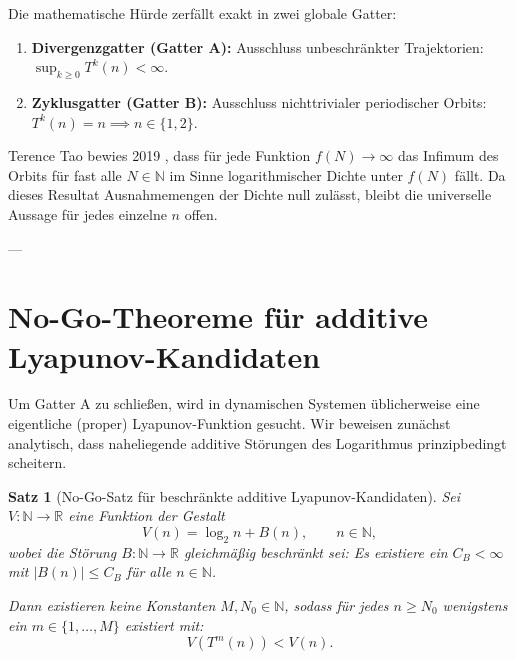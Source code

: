 \documentclass[11pt,reqno]{amsart}
\newtheorem{theorem}{Satz}[section]
\theoremstyle{definition}
\theoremstyle{remark}
\numberwithin{equation}{section}
\begin{document}
Die mathematische H\"urde zerf\"allt exakt in zwei globale Gatter:
\begin{enumerate}
\item \textbf{Divergenzgatter (Gatter A):} Ausschluss unbeschr\"ankter Trajektorien: $\sup_{k \ge 0} T^k(n) < \infty$.
\item \textbf{Zyklusgatter (Gatter B):} Ausschluss nichttrivialer periodischer Orbits: $T^k(n) = n \implies n \in \{1, 2\}$.
\end{enumerate}

Terence Tao bewies 2019 \cite{Tao2019}, dass f\"ur jede Funktion $f(N) \to \infty$ das Infimum des Orbits f\"ur fast alle $N \in \mathbb{N}$ im Sinne logarithmischer Dichte unter $f(N)$ f\"allt. Da dieses Resultat Ausnahmemengen der Dichte null zul\"asst, bleibt die universelle Aussage f\"ur jedes einzelne $n$ offen.

---

\section{No-Go-Theoreme f\"ur additive Lyapunov-Kandidaten}

Um Gatter A zu schlie\ss{}en, wird in dynamischen Systemen \"ublicherweise eine eigentliche (proper) Lyapunov-Funktion gesucht. Wir beweisen zun\"achst analytisch, dass naheliegende additive St\"orungen des Logarithmus prinzipbedingt scheitern.

\begin{theorem}[No-Go-Satz f\"ur beschr\"ankte additive Lyapunov-Kandidaten]
\label{thm:nogo_lyapunov}
Sei $V: \mathbb{N} \to \mathbb{R}$ eine Funktion der Gestalt
\begin{equation}
V(n) = \log_2 n + B(n), \qquad n \in \mathbb{N},
\end{equation}
wobei die St\"orung $B: \mathbb{N} \to \mathbb{R}$ gleichm\"a\ss{}ig beschr\"ankt sei: Es existiere ein $C_B < \infty$ mit $|B(n)| \le C_B$ f\"ur alle $n \in \mathbb{N}$.

Dann existieren keine Konstanten $M, N_0 \in \mathbb{N}$, sodass f\"ur jedes $n \ge N_0$ wenigstens ein $m \in \{1, \dots, M\}$ existiert mit:
\begin{equation}
V(T^m(n)) < V(n).
\end{equation}
\end{theorem}
\end{document}
